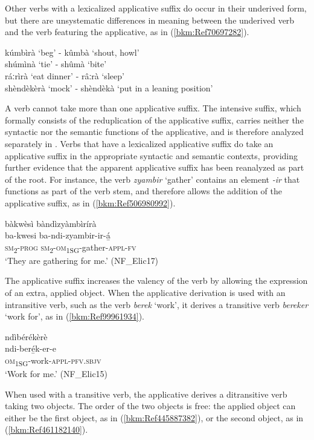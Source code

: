 Other verbs with a lexicalized applicative suffix do occur in their underived form, but there are unsystematic differences in meaning between the underived verb and the verb featuring the applicative, as in (\ref{bkm:Ref70697282}).

\ea
kúmbìrà ‘beg’  \tab -  kûmbà ‘shout, howl’\\
shúmìnà ‘tie’  \tab  -  shûmà ‘bite’\\
ráːrìrà ‘eat dinner’ \tab -  râːrà ‘sleep’\\
shèndèkèrà ‘mock’ \tab -  shèndèkà ‘put in a leaning position’\label{bkm:Ref70697282}
\z

A verb cannot take more than one applicative suffix. The intensive suffix, which formally consists of the reduplication of the applicative suffix, carries neither the syntactic nor the semantic functions of the applicative, and is therefore analyzed separately in . Verbs that have a lexicalized applicative suffix do take an applicative suffix in the appropriate syntactic and semantic contexts, providing further evidence that the apparent applicative suffix has been reanalyzed as part of the root. For instance, the verb \textit{zyambir} ‘gather’ contains an element \textit{-ir} that functions as part of the verb stem, and therefore allows the addition of the applicative suffix, as in (\ref{bkm:Ref506980992}).

\ea
\label{bkm:Ref506980992}
bàkwèsì bàndìzyàmbìrírà\\
\gll ba-kwesi  ba-ndi-zyambir-ir-á̲\\
\textsc{sm}\textsubscript{2}-\textsc{prog}  \textsc{sm}\textsubscript{2}-\textsc{om}\textsubscript{1SG}-gather-\textsc{appl}-\textsc{fv}\\
\glt ‘They are gathering for me.’ (NF\_Elic17)
\z

The applicative suffix increases the valency of the verb by allowing the expression of an extra, applied object. When the applicative derivation is used with an intransitive verb, such as the verb \textit{berek} ‘work’, it derives a transitive verb \textit{bereker} ‘work for’, as in (\ref{bkm:Ref99961934}).

\ea
\label{bkm:Ref99961934}
ndìbérékèrè\\
\gll ndi-beré̲k-er-e\\
\textsc{om}\textsubscript{1SG}-work-\textsc{appl}-\textsc{pfv}.\textsc{sbjv}\\
\glt ‘Work for me.’ (NF\_Elic15)
\z

When used with a transitive verb, the applicative derives a ditransitive verb taking two objects. The order of the two objects is free: the applied object can either be the first object, as in (\ref{bkm:Ref445887382}), or the second object, as in (\ref{bkm:Ref461182140}).

